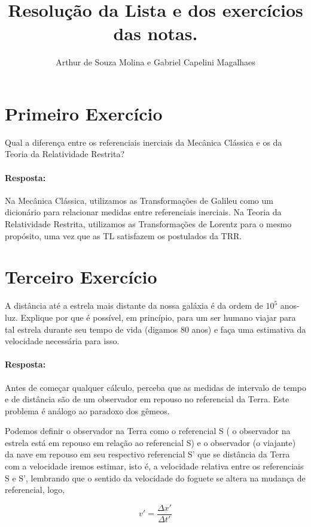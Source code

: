 \documentclass[10pt,a4paper]{article}
\author{Arthur de Souza Molina e Gabriel Capelini Magalhaes}
\title{Resolução da Lista e dos exercícios das notas.}
\begin{document}
	\maketitle
	\section{Primeiro Exercício}
	Qual a diferença entre os referenciais inerciais da Mecânica Clássica e os da Teoria da Relatividade Restrita?
	
	\paragraph{Resposta:}
	Na Mecânica Clássica, utilizamos as Transformações de Galileu como um dicionário para relacionar medidas entre referenciais inerciais. Na Teoria da Relatividade Restrita, utilizamos as Transformações de Lorentz para o mesmo propósito, uma vez que as TL satisfazem os postulados da TRR.
	
	
	\section{Terceiro Exercício}
	A distância até a estrela mais distante da nossa galáxia é da ordem de $10^{5}$ anos-luz. Explique por que é possível, em princípio, para um ser humano viajar para tal estrela durante seu tempo de vida (digamos 80 anos) e faça uma estimativa da velocidade necessária para isso.
	\paragraph{Resposta:}
	Antes de começar qualquer cálculo, perceba que as medidas de intervalo de tempo e de distância são de um observador em repouso no referencial da Terra. Este problema é análogo ao paradoxo dos gêmeos.
	
	Podemos definir o observador na Terra como o referencial S ( o observador na estrela está em repouso em relação ao referencial S) e o observador (o viajante) da nave em repouso em seu respectivo referencial S' que se distância da Terra com a velocidade iremos estimar, isto é, a velocidade relativa entre os referenciais S e S', lembrando que o sentido da velocidade do foguete se altera na mudança de referencial, logo,
	
	\begin{equation}\label{v_foguete}
		  v' = \dfrac{\Delta x'}{\Delta t'}
	\end{equation}
	
\end{document}
